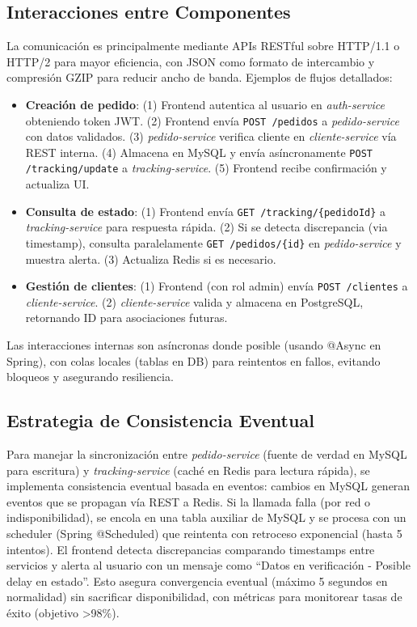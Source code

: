 \documentclass[a4paper,12pt]{article}
\begin{document}
\subsection{Interacciones entre Componentes}
La comunicación es principalmente mediante APIs RESTful sobre HTTP/1.1 o HTTP/2 para mayor eficiencia, con JSON como formato de intercambio y compresión GZIP para reducir ancho de banda. Ejemplos de flujos detallados:
\begin{itemize}
    \item \textbf{Creación de pedido}: (1) Frontend autentica al usuario en \textit{auth-service} obteniendo token JWT. (2) Frontend envía \texttt{POST /pedidos} a \textit{pedido-service} con datos validados. (3) \textit{pedido-service} verifica cliente en \textit{cliente-service} vía REST interna. (4) Almacena en MySQL y envía asíncronamente \texttt{POST /tracking/update} a \textit{tracking-service}. (5) Frontend recibe confirmación y actualiza UI.
    \item \textbf{Consulta de estado}: (1) Frontend envía \texttt{GET /tracking/\{pedidoId\}} a \textit{tracking-service} para respuesta rápida. (2) Si se detecta discrepancia (via timestamp), consulta paralelamente \texttt{GET /pedidos/\{id\}} en \textit{pedido-service} y muestra alerta. (3) Actualiza Redis si es necesario.
    \item \textbf{Gestión de clientes}: (1) Frontend (con rol admin) envía \texttt{POST /clientes} a \textit{cliente-service}. (2) \textit{cliente-service} valida y almacena en PostgreSQL, retornando ID para asociaciones futuras.
\end{itemize}
Las interacciones internas son asíncronas donde posible (usando @Async en Spring), con colas locales (tablas en DB) para reintentos en fallos, evitando bloqueos y asegurando resiliencia.

\subsection{Estrategia de Consistencia Eventual}
Para manejar la sincronización entre \textit{pedido-service} (fuente de verdad en MySQL para escritura) y \textit{tracking-service} (caché en Redis para lectura rápida), se implementa consistencia eventual basada en eventos: cambios en MySQL generan eventos que se propagan vía REST a Redis. Si la llamada falla (por red o indisponibilidad), se encola en una tabla auxiliar de MySQL y se procesa con un scheduler (Spring @Scheduled) que reintenta con retroceso exponencial (hasta 5 intentos). El frontend detecta discrepancias comparando timestamps entre servicios y alerta al usuario con un mensaje como ``Datos en verificación - Posible delay en estado''. Esto asegura convergencia eventual (máximo 5 segundos en normalidad) sin sacrificar disponibilidad, con métricas para monitorear tasas de éxito (objetivo >98\%).
\end{document}
